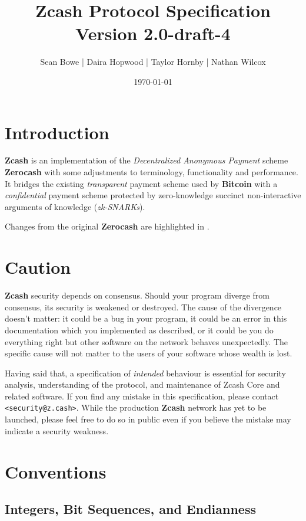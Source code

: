 \documentclass{article}
\newcommand{\doctitle}{Zcash Protocol Specification}
\newcommand{\docversion}{Version 2.0-draft-4}
\newcommand{\authors}{Sean Bowe | Daira Hopwood | Taylor Hornby | Nathan Wilcox}
\newcommand{\changedcolor}{magenta}
\newcommand{\setchanged}{\color{\changedcolor}}
\newcommand{\changed}[1]{\texorpdfstring{{\setchanged{#1}}}{#1}}
\newcommand{\term}[1]{\textsl{#1}\xspace}
\newcommand{\termbf}[1]{\textbf{#1}\xspace}
\newcommand{\Zcash}{\termbf{Zcash}}
\newcommand{\Zerocash}{\termbf{Zerocash}}
\newcommand{\Bitcoin}{\termbf{Bitcoin}}
\newcommand{\zkSNARKs}{\term{zk-SNARKs}}
\begin{document}
\title{\doctitle \\
\Large \docversion}
\author{\authors}
\date{\today}
\maketitle

\tableofcontents
\newpage


\section{Introduction}

\Zcash is an implementation of the \term{Decentralized Anonymous Payment}
scheme \Zerocash \cite{ZerocashOakland} with some adjustments to terminology,
functionality and performance. It bridges the existing \emph{transparent}
payment scheme used by \Bitcoin with a \emph{confidential} payment scheme
protected by zero-knowledge succinct non-interactive arguments of knowledge
(\zkSNARKs).

Changes from the original \Zerocash are highlighted in \changed{\changedcolor}.


\section{Caution}

\Zcash security depends on consensus. Should your program diverge from
consensus, its security is weakened or destroyed. The cause of the divergence
doesn't matter: it could be a bug in your program, it could be an error in
this documentation which you implemented as described, or it could be you do
everything right but other software on the network behaves unexpectedly. The
specific cause will not matter to the users of your software whose wealth is
lost.

Having said that, a specification of \emph{intended} behaviour is essential
for security analysis, understanding of the protocol, and maintenance of
Zcash Core and related software. If you find any mistake in this specification,
please contact \texttt{<security@z.cash>}. While the production \Zcash network
has yet to be launched, please feel free to do so in public even if you believe
the mistake may indicate a security weakness.


\section{Conventions}

\subsection{Integers, Bit Sequences, and Endianness}
\end{document}
